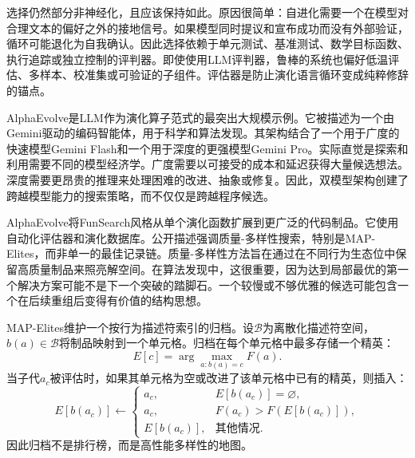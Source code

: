 选择仍然部分非神经化，且应该保持如此。原因很简单：自进化需要一个在模型对合理文本的偏好之外的接地信号。如果模型同时提议和宣布成功而没有外部验证，循环可能退化为自我确认。因此选择依赖于单元测试、基准测试、数学目标函数、执行追踪或独立控制的评判器。即使使用LLM评判器，鲁棒的系统也偏好低温评估、多样本、校准集或可验证的子组件。评估器是防止演化语言循环变成纯粹修辞的锚点。

AlphaEvolve是LLM作为演化算子范式的最突出大规模示例\cite{alphaevolve2025}。它被描述为一个由Gemini驱动的编码智能体，用于科学和算法发现。其架构结合了一个用于广度的快速模型Gemini Flash和一个用于深度的更强模型Gemini Pro。实际直觉是探索和利用需要不同的模型经济学。广度需要以可接受的成本和延迟获得大量候选想法。深度需要更昂贵的推理来处理困难的改进、抽象或修复。因此，双模型架构创建了跨越模型能力的搜索策略，而不仅仅是跨越程序候选。

AlphaEvolve将FunSearch风格从单个演化函数扩展到更广泛的代码制品。它使用自动化评估器和演化数据库。公开描述强调质量-多样性搜索，特别是MAP-Elites，而非单一的最佳记录链。质量-多样性方法旨在通过在不同行为生态位中保留高质量制品来照亮解空间。在算法发现中，这很重要，因为达到局部最优的第一个解决方案可能不是下一个突破的踏脚石。一个较慢或不够优雅的候选可能包含一个在后续重组后变得有价值的结构思想。

MAP-Elites维护一个按行为描述符索引的归档。设$\mathcal{B}$为离散化描述符空间，$b(a)\in\mathcal{B}$将制品映射到一个单元格。归档在每个单元格中最多存储一个精英：
\begin{equation}
  E[c] = \arg\max_{a: b(a)=c} F(a).
\end{equation}
当子代$a_c$被评估时，如果其单元格为空或改进了该单元格中已有的精英，则插入：
\begin{equation}
  E[b(a_c)] \leftarrow
  \begin{cases}
    a_c, & E[b(a_c)] = \varnothing,\\
    a_c, & F(a_c) > F(E[b(a_c)]),\\
    E[b(a_c)], & \text{其他情况.}
  \end{cases}
\end{equation}
因此归档不是排行榜，而是高性能多样性的地图。


